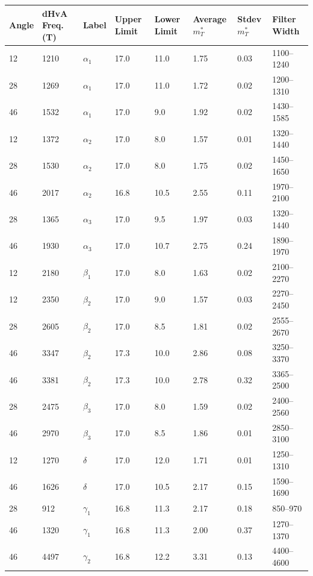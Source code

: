 \begin{center}
    \begin{tabular}[!h]{llllllll}
\toprule
Angle	& dHvA Freq. (\unit{T})	& Label	 & Upper Limit	& Lower	Limit	& Average $m^*_T$	& Stdev $m^*_T$	& Filter Width\\
\midrule
12	& 1210	& $\alpha_1$	& 17.0	& 11.0	& 1.75	& 0.03 &	1100--1240\\
28	& 1269	& $\alpha_1$	& 17.0	& 11.0	& 1.72	& 0.02 &	1200--1310\\
46	& 1532	& $\alpha_1$	& 17.0	& 9.0	& 1.92	& 0.02 &	1430--1585\\
12	& 1372	& $\alpha_2$	& 17.0	& 8.0	& 1.57	& 0.01 &	1320--1440\\
28	& 1530	& $\alpha_2$	& 17.0	& 8.0	& 1.75	& 0.02 &	1450--1650\\
46	& 2017	& $\alpha_2$	& 16.8	& 10.5	& 2.55	& 0.11 &	1970--2100\\
28	& 1365	& $\alpha_3$	& 17.0	& 9.5	& 1.97	& 0.03 &	1320--1440\\
46	& 1930	& $\alpha_3$	& 17.0	& 10.7	& 2.75	& 0.24 &	1890--1970\\
12	& 2180	& $\beta_1$	& 17.0	& 8.0	& 1.63	& 0.02 &	2100--2270\\
12	& 2350	& $\beta_2$	& 17.0	& 9.0	& 1.57	& 0.03 &	2270--2450\\
28	& 2605	& $\beta_2$	& 17.0	& 8.5	& 1.81	& 0.02 &	2555--2670\\
46	& 3347	& $\beta_2$	& 17.3	& 10.0	& 2.86	& 0.08 &	3250--3370\\
46	& 3381	& $\beta_2$	& 17.3	& 10.0	& 2.78	& 0.32 &	3365--2500\\
28	& 2475	& $\beta_3$	& 17.0	& 8.0	& 1.59	& 0.02 &	2400--2560\\
46	& 2970	& $\beta_3$	& 17.0	& 8.5	& 1.86	& 0.01 &	2850--3100\\
12	& 1270	& $\delta$	& 17.0	& 12.0	& 1.71	& 0.01 &	1250--1310\\
46	& 1626	& $\delta$	& 17.0	& 10.5	& 2.17	& 0.15 &	1590--1690\\
28	& 912	& $\gamma_1$	& 16.8	& 11.3	& 2.17	& 0.18 &	850--970  \\
46	& 1320	& $\gamma_1$	& 16.8	& 11.3	& 2.00	& 0.37 &	1270--1370\\
46	& 4497	& $\gamma_2$	& 16.8	& 12.2	& 3.31	& 0.13 &	4400--4600\\
\bottomrule
    \end{tabular}
    \label{Table:3:MicroFitResults}
    \caption{}
\end{center}

